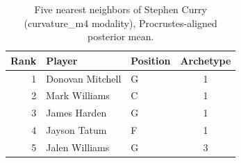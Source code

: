 \begin{table}[htbp]
  \centering\small
  \begin{tabular}{rllc}
    \toprule
    Rank & Player & Position & Archetype \\
    \midrule
    1 & Donovan Mitchell & G & 1 \\
    2 & Mark Williams & C & 1 \\
    3 & James Harden & G & 1 \\
    4 & Jayson Tatum & F & 1 \\
    5 & Jalen Williams & G & 3 \\
    \bottomrule
  \end{tabular}
  \caption{Five nearest neighbors of Stephen Curry (curvature_m4 modality), Procrustes-aligned posterior mean.}
  \label{tab:Stephen_Curry_neighbors_curvature_m4}
\end{table}

